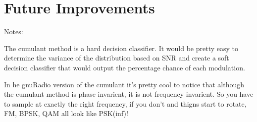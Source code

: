 \section{Future Improvements}

Notes:

The cumulant method is a hard decision classifier.  It would be pretty easy to
determine the variance of the distribution based on SNR and create a soft
decision classifier that would output the percentage chance of each modulation.

In he gnuRadio version of the cumulant it's pretty cool to notice that although
the cumulant method is phase invarient, it is not frequency invarient.  So you
have to sample at exactly the right frequency, if you don't and thigns start to
rotate, FM, BPSK, QAM all look like PSK(inf)!
